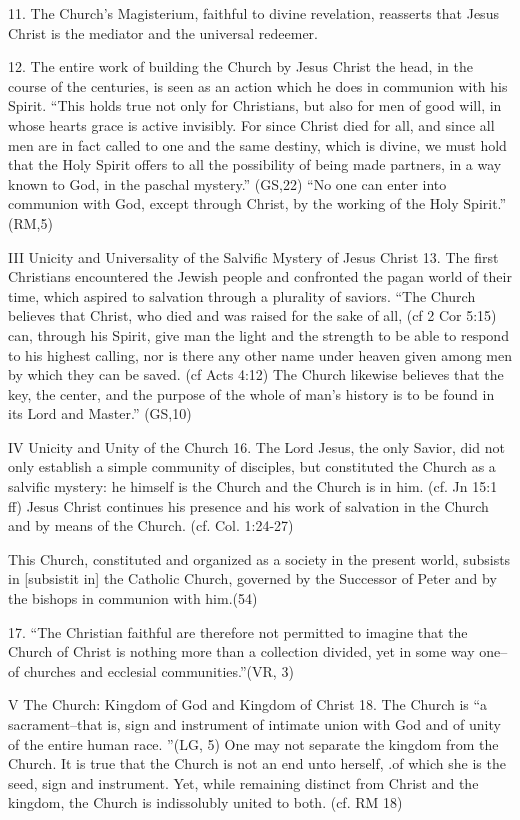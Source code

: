 \documentclass[oneside]{book}
\begin{document}
11. The Church's Magisterium, faithful to divine revelation, reasserts that
Jesus Christ is the mediator and the universal redeemer.

12. The entire work of building the Church by Jesus Christ the head, in the
course of the centuries, is seen as an action which he does in communion with
his Spirit. ``This holds true not only for Christians, but also for men of good
will, in whose hearts grace is active invisibly. For since Christ died for all,
and since all men are in fact called to one and the same destiny, which is
divine, we must hold that the Holy Spirit offers to all the possibility of being
made partners, in a way known to God, in the paschal mystery.'' (GS,22) ``No one
can enter into communion with God, except through Christ, by the working of the
Holy Spirit.'' (RM,5)

III Unicity and Universality of the Salvific Mystery of Jesus Christ
13. The first Christians encountered the Jewish people and confronted the pagan
world of their time, which aspired to salvation through a plurality of
saviors. ``The Church believes that Christ, who died and was raised for the sake
of all, (cf 2 Cor 5:15) can, through his Spirit, give man the light and the
strength to be able to respond to his highest calling, nor is there any other
name under heaven given among men by which they can be saved. (cf Acts 4:12) The
Church likewise believes that the key, the center, and the purpose of the whole
of man's history is to be found in its Lord and Master.'' (GS,10)

IV  Unicity and Unity of the Church
16. The Lord Jesus, the only Savior, did not only establish a simple community
of disciples, but constituted the Church as a salvific mystery: he himself is
the Church and the Church is in him. (cf. Jn 15:1 ff) Jesus Christ continues his
presence and his work of salvation in the Church and by means of the
Church. (cf. Col. 1:24-27)

This Church, constituted and organized as a society in the present world,
subsists in [subsistit in] the Catholic Church, governed by the Successor of
Peter and by the bishops in communion with him.(54)

17. ``The Christian faithful are therefore not permitted to imagine that the
Church of Christ is nothing more than a collection  divided, yet in some way
one--of churches and ecclesial communities.''(VR, 3)

V The Church: Kingdom of God and Kingdom of Christ
18. The Church is ``a sacrament--that is, sign and instrument of intimate union
with God and of unity of the entire human race. ''(LG, 5) One may not separate
the kingdom from the Church. It is true that the Church is not an end unto
herself, .of which she is the seed, sign and instrument. Yet, while remaining
distinct from Christ and the kingdom, the Church is indissolubly united to
both. (cf. RM 18)
\end{document}
